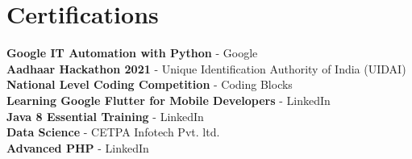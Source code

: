 \documentclass[]{deedy-resume-openfont}
\begin{document}
\begin{minipage}[t]{0.4\textwidth}

\section{Certifications}

\textbf{Google IT Automation with Python} - Google\\
\textbf{Aadhaar Hackathon 2021} - Unique Identification Authority of India (UIDAI)\\
\textbf{National Level Coding Competition} - Coding Blocks\\
\textbf{Learning Google Flutter for Mobile Developers} - LinkedIn\\
\textbf{Java 8 Essential Training} - LinkedIn\\
\textbf{Data Science} - CETPA Infotech Pvt. ltd.\\
\textbf{Advanced PHP} - LinkedIn\\

%
%

\end{minipage} 
\hfill
\end{document}

